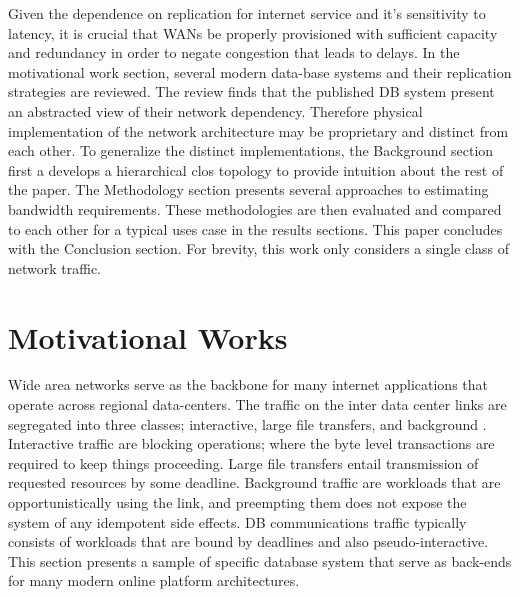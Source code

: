 \documentclass[conference]{IEEEtran}
\begin{document}
Given the dependence on replication for internet service and it's sensitivity to latency, it is crucial that WANs be properly provisioned with sufficient capacity and redundancy in order to negate congestion that leads to delays. In the motivational work section, several modern data-base systems and their replication strategies are reviewed. The review finds that the published DB system present an abstracted view of their network dependency. Therefore physical implementation of the network architecture may be proprietary and distinct from each other. To generalize the distinct implementations, the Background section first a develops a hierarchical clos topology to provide intuition about the rest of the paper. The Methodology section presents several approaches to estimating bandwidth requirements. These methodologies are then evaluated and compared to each other for a typical uses case in the results sections. This paper concludes with the Conclusion section. For brevity, this work only considers a single class of network traffic. 

\section{Motivational Works}

Wide area networks serve as the backbone for many internet applications that operate across regional data-centers. The traffic on the inter data center links are segregated into three classes; interactive, large file transfers, and background \cite{Zhang}. Interactive traffic are blocking operations; where the byte level transactions are required to keep things proceeding. Large file transfers entail transmission of requested resources by some deadline. Background traffic are workloads that are opportunistically using the link, and preempting them does not expose the system of any idempotent side effects. DB communications traffic typically consists of workloads that are bound by deadlines and also pseudo-interactive. This section presents a sample of specific database system that serve as back-ends for many modern online platform architectures. 

\end{document}

